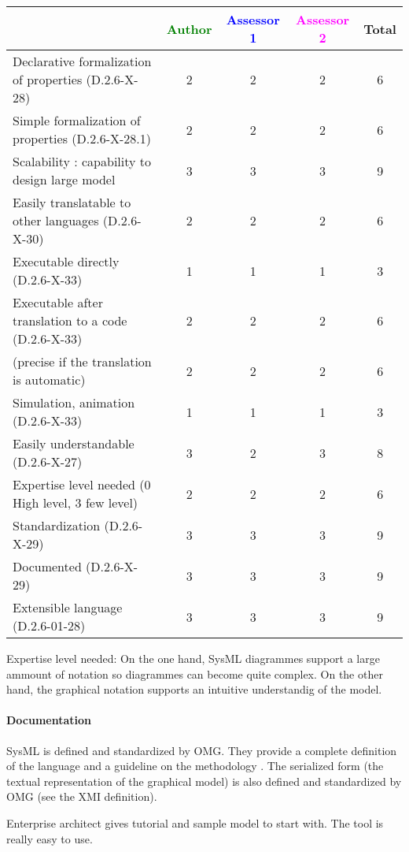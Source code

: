 \begin{tabular}{|l | c | c | c | c|}
\hline
& \textcolor{green}{Author} & \textcolor{blue}{Assessor 1} & \textcolor{magenta}{Assessor 2} & Total \\
\hline
Declarative formalization of properties (D.2.6-X-28) & 2 & 2 & 2 & 6 \\
\hline
Simple formalization of properties (D.2.6-X-28.1) &2 &2 & 2& 6 \\
\hline
Scalability : capability to design large model &3 &3 &3 & 9 \\
\hline
Easily translatable to other languages (D.2.6-X-30) &2 &2 & 2& 6 \\
\hline
Executable directly (D.2.6-X-33) &1 & 1& 1& 3 \\
\hline
Executable after translation to a code (D.2.6-X-33) & 2 & 2& 2& 6 \\
(precise if the translation is automatic) &2 & 2& 2& 6 \\
\hline
Simulation, animation (D.2.6-X-33) &1 & 1& 1& 3 \\
\hline
Easily understandable (D.2.6-X-27) &3 & 2& 3& 8 \\
\hline
Expertise level needed (0 High level, 3 few level) &2 &2 & 2& 6 \\
\hline
Standardization (D.2.6-X-29) &3 & 3& 3& 9 \\
\hline
Documented (D.2.6-X-29) &3 & 3& 3& 9 \\
\hline
Extensible language (D.2.6-01-28) &3 & 3& 3& 9 \\
\hline
\end{tabular}
\begin{assessor2}
Expertise level needed: On the one hand, SysML diagrammes support a large ammount of notation so diagrammes can become quite complex. On the other hand, the graphical notation supports an intuitive understandig of the model.
\end{assessor2}

\paragraph{Documentation} 
SysML is  defined and standardized by OMG. They provide a complete
definition of the language and a guideline on the methodology
\cite{SysML}. The serialized form (the textual representation of the
graphical model) is also defined and standardized by OMG (see the XMI
definition).

Enterprise architect gives tutorial and sample model to start
with. The tool is really easy to use.

